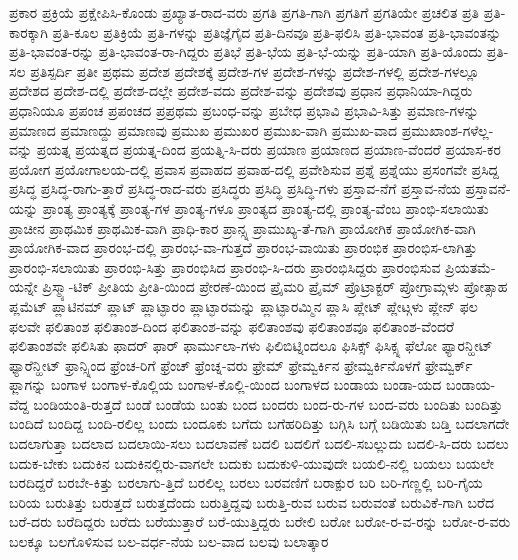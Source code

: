 {ಪ್ರಕಾರ
ಪ್ರಕ್ರಿಯೆ
ಪ್ರಕ್ಷೇಪಿಸಿ-ಕೊಂಡು
ಪ್ರಖ್ಯಾತ-ರಾದ-ವರು
ಪ್ರಗತಿ
ಪ್ರಗತಿ-ಗಾಗಿ
ಪ್ರಗತಿಗೆ
ಪ್ರಗತಿಯೇ
ಪ್ರಚಲಿತ
ಪ್ರತಿ
ಪ್ರತಿ-ಕಾರಕ್ಕಾಗಿ
ಪ್ರತಿ-ಕೂಲ
ಪ್ರತಿಕ್ರಿಯೆ
ಪ್ರತಿ-ಗಳನ್ನು
ಪ್ರತಿಜ್ಞೆಗೈದ
ಪ್ರತಿ-ದಿನವೂ
ಪ್ರತಿ-ಫಲಿಸಿ
ಪ್ರತಿ-ಭಾವಂತ
ಪ್ರತಿ-ಭಾವಂತನ್ನು
ಪ್ರತಿ-ಭಾವಂತ-ರನ್ನು
ಪ್ರತಿ-ಭಾವಂತ-ರಾ-ಗಿದ್ದರು
ಪ್ರತಿಭೆ
ಪ್ರತಿ-ಭೆಯ
ಪ್ರತಿ-ಭೆ-ಯನ್ನು
ಪ್ರತಿ-ಯಾಗಿ
ಪ್ರತಿ-ಯೊಂದು
ಪ್ರತಿ-ಸಲ
ಪ್ರತಿಸ್ಪರ್ದಿ
ಪ್ರತೀ
ಪ್ರಥಮ
ಪ್ರದೇಶ
ಪ್ರದೇಶಕ್ಕೆ
ಪ್ರದೇಶ-ಗಳ
ಪ್ರದೇಶ-ಗಳನ್ನು
ಪ್ರದೇಶ-ಗಳಲ್ಲಿ
ಪ್ರದೇಶ-ಗಳಲ್ಲೂ
ಪ್ರದೇಶದ
ಪ್ರದೇಶ-ದಲ್ಲಿ
ಪ್ರದೇಶ-ದಲ್ಲೇ
ಪ್ರದೇಶ-ವದು
ಪ್ರದೇಶ-ವನ್ನು
ಪ್ರದೇಶವು
ಪ್ರಧಾನ
ಪ್ರಧಾನಿಯಾ-ಗಿದ್ದರು
ಪ್ರಧಾನಿಯೂ
ಪ್ರಪಂಚ
ಪ್ರಪಂಚದ
ಪ್ರಪ್ರಥಮ
ಪ್ರಬಂಧ-ವನ್ನು
ಪ್ರಬೇಧ
ಪ್ರಭಾವಿ
ಪ್ರಭಾವಿ-ಸಿತ್ತು
ಪ್ರಮಾಣ-ಗಳನ್ನು
ಪ್ರಮಾಣದ
ಪ್ರಮಾಣದ್ದು
ಪ್ರಮಾಣವು
ಪ್ರಮುಖ
ಪ್ರಮುಖರ
ಪ್ರಮುಖ-ವಾಗಿ
ಪ್ರಮುಖ-ವಾದ
ಪ್ರಮುಖಾಂಶ-ಗಳೆಲ್ಲ-ವನ್ನು
ಪ್ರಯತ್ನ
ಪ್ರಯತ್ನದ
ಪ್ರಯತ್ನ-ದಿಂದ
ಪ್ರಯತ್ನಿ-ಸಿ-ದರು
ಪ್ರಯಾಣ
ಪ್ರಯಾಣದ
ಪ್ರಯಾಣ-ವೆಂದರೆ
ಪ್ರಯಾಸ-ಕರ
ಪ್ರಯೋಗ
ಪ್ರಯೋಗಾಲಯ-ದಲ್ಲಿ
ಪ್ರವಾಸ
ಪ್ರವಾಹದ
ಪ್ರವಾಹ-ದಲ್ಲಿ
ಪ್ರವೇಶಿಸುವ
ಪ್ರಶ್ನೆ
ಪ್ರಶ್ನೆಯು
ಪ್ರಸಂಗವೇ
ಪ್ರಸಿದ್ದ
ಪ್ರಸಿದ್ಧ
ಪ್ರಸಿದ್ಧ-ರಾಗು-ತ್ತಾರೆ
ಪ್ರಸಿದ್ಧ-ರಾದ-ವರು
ಪ್ರಸಿದ್ಧರು
ಪ್ರಸಿದ್ಧಿ
ಪ್ರಸಿದ್ಧಿ-ಗಳು
ಪ್ರಸ್ತಾವ-ನೆಗೆ
ಪ್ರಸ್ತಾವ-ನೆಯ
ಪ್ರಸ್ತಾವನೆ-ಯನ್ನು
ಪ್ರಾಂತ್ಯ
ಪ್ರಾಂತ್ಯಕ್ಕೆ
ಪ್ರಾಂತ್ಯ-ಗಳ
ಪ್ರಾಂತ್ಯ-ಗಳೂ
ಪ್ರಾಂತ್ಯದ
ಪ್ರಾಂತ್ಯ-ದಲ್ಲಿ
ಪ್ರಾಂತ್ಯ-ವೆಂಬ
ಪ್ರಾಂಭಿ-ಸಲಾಯಿತು
ಪ್ರಾಚೀನ
ಪ್ರಾಥಮಿಕ
ಪ್ರಾಥಮಿಕ-ವಾಗಿ
ಪ್ರಾಧಿ-ಕಾರ
ಪ್ರಾನ್ಸ್ನ
ಪ್ರಾಮುಖ್ಯ-ತೆ-ಗಾಗಿ
ಪ್ರಾಯೋಗಿಕ
ಪ್ರಾಯೋಗಿಕ-ವಾಗಿ
ಪ್ರಾಯೋಗಿಕ-ವಾದ
ಪ್ರಾರಂಭ-ದಲ್ಲಿ
ಪ್ರಾರಂಭ-ವಾ-ಗುತ್ತದೆ
ಪ್ರಾರಂಭ-ವಾಯಿತು
ಪ್ರಾರಂಭಿಕ
ಪ್ರಾರಂಭಿಸ-ಲಾಗಿತ್ತು
ಪ್ರಾರಂಭಿ-ಸಲಾಯಿತು
ಪ್ರಾರಂಭಿ-ಸಿತ್ತು
ಪ್ರಾರಂಭಿಸಿದ
ಪ್ರಾರಂಭಿ-ಸಿ-ದರು
ಪ್ರಾರಂಭಿಸಿದ್ದರು
ಪ್ರಾರಂಭಿಸುವ
ಪ್ರಿಯತಮೆ-ಯನ್ನೇ
ಪ್ರಿಸ್ಮ್ಯಾ-ಟಿಕ್
ಪ್ರೀತಿಯ
ಪ್ರೀತಿ-ಯಿಂದ
ಪ್ರೇರಣೆ-ಯಿಂದ
ಪ್ರೈಮರಿ
ಪ್ರೈಮ್
ಪ್ರೊಟ್ರಾಕ್ಟರ್
ಪ್ರೋಗ್ರಾಮ್ಗಳು
ಪ್ರೋತ್ಸಾಹ
ಪ್ಲಮೆಟ್
ಪ್ಲಾಟಿನಮ್
ಪ್ಲಾಟ್
ಪ್ಲಾಟ್ಫಾರಂ
ಪ್ಲಾಟ್ಫಾರಮನ್ನು
ಪ್ಲಾಟ್ಫಾರಮ್ಮಿನ
ಪ್ಲಾಸಿ
ಪ್ಲೇಟ್
ಪ್ಲೇಟ್ಗಳು
ಪ್ಲೇನ್
ಫಲ
ಫಲವೇ
ಫಲಿತಾಂಶ
ಫಲಿತಾಂಶ-ದಿಂದ
ಫಲಿತಾಂಶ-ವನ್ನು
ಫಲಿತಾಂಶವು
ಫಲಿತಾಂಶವೂ
ಫಲಿತಾಂಶ-ವೆಂದರೆ
ಫಲಿತಾಂಶವೇ
ಫಲಿಸಿತು
ಫಾದರ್
ಫಾರ್
ಫಾರ್ಮುಲಾ-ಗಳು
ಫಿಲಿಬಿಟ್ನಿಂದಲೂ
ಫಿಸಿಕ್ಸ್
ಫಿಸಿಕ್ಸ್ನ
ಫೆಲೋ
ಫ್ಯಾರನ್ಹೀಟ್
ಫ್ಯಾರೆನ್ಹೀಟ್
ಫ್ರಾನ್ಸ್ನಿಂದ
ಫ್ರೆಂಚ-ರಿಗೆ
ಫ್ರೆಂಚ್
ಫ್ರೆಂಚ್ನ-ವರು
ಫ್ರೇಮ್
ಫ್ರೇಮ್ವರ್ಕಿನ
ಫ್ರೇಮ್ವರ್ಕಿನೊಳಗೆ
ಫ್ರೇಮ್ವರ್ಕ್
ಫ್ಲಾಗನ್ನು
ಬಂಗಾಳ
ಬಂಗಾಳ-ಕೊಲ್ಲಿಯ
ಬಂಗಾಳ-ಕೊಲ್ಲಿ-ಯಿಂದ
ಬಂಗಾಳದ
ಬಂಡಾಯ
ಬಂಡಾ-ಯದ
ಬಂಡಾಯ-ವೆದ್ದ
ಬಂಡಿಯಂತಿ-ರುತ್ತದೆ
ಬಂಡೆ
ಬಂಡೆಯ
ಬಂತು
ಬಂದ
ಬಂದರು
ಬಂದ-ರು-ಗಳ
ಬಂದ-ವರು
ಬಂದಿತು
ಬಂದಿತ್ತು
ಬಂದಿದೆ
ಬಂದಿದ್ದ
ಬಂದಿ-ರಲಿಲ್ಲ
ಬಂದು
ಬಂದೂಕು
ಬಗೆದು
ಬಗೆಹರಿದಿತ್ತು
ಬಗ್ಗಿಸಿ
ಬಗ್ಗೆ
ಬಡಿಯಿತು
ಬಡ್ತಿ
ಬದಲಾಗದೇ
ಬದಲಾಗುತ್ತಾ
ಬದಲಾದ
ಬದಲಾಯಿ-ಸಲು
ಬದಲಾವಣೆ
ಬದಲಿ
ಬದಲಿಗೆ
ಬದಲಿ-ಸಬಲ್ಲುದು
ಬದಲಿ-ಸಿ-ದರು
ಬದಲು
ಬದುಕ-ಬೇಕು
ಬದುಕಿನ
ಬದುಕಿನಲ್ಲಿರು-ವಾಗಲೇ
ಬದುಕು
ಬದುಕುಳಿ-ಯುವುದೇ
ಬಯಲಿ-ನಲ್ಲಿ
ಬಯಲು
ಬಯಲೇ
ಬರದಿದ್ದರೆ
ಬರಬೇ-ಕಿತ್ತು
ಬರಲಾಗು-ತ್ತಿದೆ
ಬರಲಿಲ್ಲ
ಬರಲು
ಬರವಣಿಗೆ
ಬರಾಕ್ಪುರ
ಬರಿ
ಬರಿ-ಗಣ್ಣಲ್ಲಿ
ಬರಿ-ಗೈಯ
ಬರಿಯ
ಬರುತಿತ್ತು
ಬರುತ್ತದೆ
ಬರುತ್ತದೆಂದು
ಬರುತ್ತಿದ್ದವು
ಬರುತ್ತಿ-ರುವ
ಬರುವ
ಬರುವಂತೆ
ಬರುವಿಕೆ-ಗಾಗಿ
ಬರೆದ
ಬರೆ-ದರು
ಬರೆದಿದ್ದರು
ಬರೆದು
ಬರೆಯುತ್ತಾರೆ
ಬರೆ-ಯುತ್ತಿದ್ದರು
ಬರೇಲಿ
ಬರೋ
ಬರೋ-ರ-ವ-ರನ್ನು
ಬರೋ-ರ-ವರು
ಬಲಕ್ಕೂ
ಬಲಗೊಳಿಸುವ
ಬಲ-ವರ್ಧ-ನೆಯ
ಬಲ-ವಾದ
ಬಲವು
ಬಲಾತ್ಕಾರ
}
